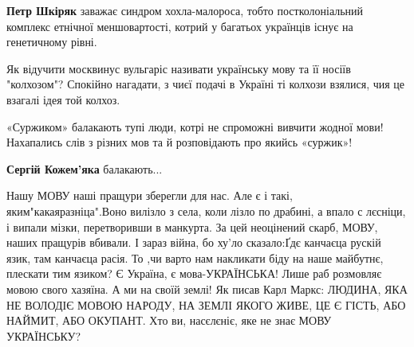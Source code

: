\begin{itemize}
\begin{itemize}
\textbf{Петр Шкіряк} заважає синдром хохла-малороса, тобто постколоніальний комплекс етнічної меншовартості, котрий у багатьох українців існує на генетичному рівні.
\end{itemize}

 

Як відучити москвинус вульгаріс називати українську мову та її носіїв
"колхозом"? Спокійно нагадати, з чиєї подачі в Україні ті колхози взялися, чия
це взагалі ідея той колхоз.


 

«Суржиком» балакають тупі люди, котрі не спроможні вивчити жодної мови!
Нахапались слів з різних мов та й розповідають про якийсь «суржик»!

\begin{itemize}
 
\textbf{Сергій Кожем'яка} балакають...
\end{itemize}

 

Нашу МОВУ наші пращури зберегли для нас. Але є і такі, яким"какаяразніца".Воно
вилізло з села, коли лізло по драбині, а впало с лєсніци, і випали
мізки, перетворивши в манкурта. За цей неоцінений скарб, МОВУ, наших пращурів
вбивали. І зараз війна, бо ху'ло сказало:Ґдє канчаєца рускій язик, там канчаєца
расія. То ,чи варто нам накликати біду на наше майбутнє, плескати тим язиком? Є
Україна, є мова-УКРАЇНСЬКА! Лише раб розмовляє мовою свого хазяїна. А ми на своїй
землі! Як писав Карл Маркс: ЛЮДИНА, ЯКА НЕ ВОЛОДІЄ МОВОЮ НАРОДУ, НА ЗЕМЛІ ЯКОГО
ЖИВЕ, ЦЕ Є ГІСТЬ, АБО НАЙМИТ, АБО ОКУПАНТ. Хто ви, насєлєніє, яке не знає МОВУ
УКРАЇНСЬКУ?



\end{itemize}
